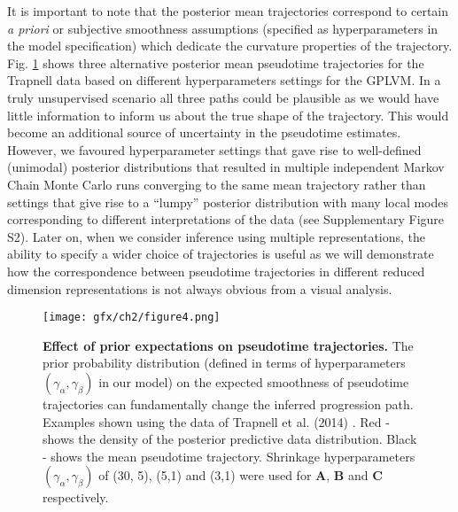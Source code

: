 It is important to note that the posterior mean trajectories correspond to certain \textit{a priori} or subjective smoothness assumptions (specified as hyperparameters in the model specification) which dedicate the curvature properties of the trajectory. Fig. \ref{fig:varygamma} shows three alternative posterior mean pseudotime trajectories for the Trapnell data based on different hyperparameters settings for the GPLVM. In a truly unsupervised scenario all three paths could be plausible as we would have little information to inform us about the true shape of the trajectory. This would become an additional source of uncertainty in the pseudotime estimates. However, we favoured hyperparameter settings that gave rise to well-defined (unimodal) posterior distributions that resulted in multiple independent Markov Chain Monte Carlo runs converging to the same mean trajectory rather than settings that give rise to a ``lumpy'' posterior distribution with many local modes corresponding to different interpretations of the data (see Supplementary Figure S2). Later on, when we consider inference using multiple representations, the ability to specify a wider choice of trajectories is useful as we will demonstrate how the correspondence between pseudotime trajectories in different reduced dimension representations is not always obvious from a visual analysis.

\begin{figure}

	\centering
	\texttt{[image: gfx/ch2/figure4.png]}
  \caption{{\bf Effect of prior expectations on pseudotime trajectories.}
      The prior probability distribution (defined in terms of hyperparameters $(\gamma_\alpha, \gamma_\beta)$ in our model) on the expected smoothness of pseudotime trajectories can fundamentally change the inferred progression path. Examples shown using the data of Trapnell et al. (2014) \cite{Trapnell2014}. Red - shows the density of the posterior predictive data distribution. Black - shows the mean pseudotime trajectory. Shrinkage hyperparameters $(\gamma_\alpha, \gamma_\beta)$ of (30, 5), (5,1) and (3,1) were used for \textbf{A}, \textbf{B} and \textbf{C} respectively.}
	\label{fig:varygamma}
\end{figure}

